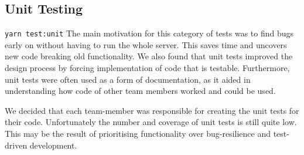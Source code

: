 \subsection{Unit Testing}
\texttt{yarn test:unit}
The main motivation for this category of tests was to find bugs early on without having to run the whole server. This saves time and uncovers new code breaking old functionality. We also found that unit tests improved the design process by forcing implementation of code that is testable. Furthermore, unit tests were often used as a form of documentation, as it aided in understanding how code of other team members worked and could be used. \par
We decided that each team-member was responsible for creating the unit tests for their code. Unfortunately the number and coverage of unit tests is still quite low. This may be the result of prioritising functionality over bug-resilience and test-driven development.
